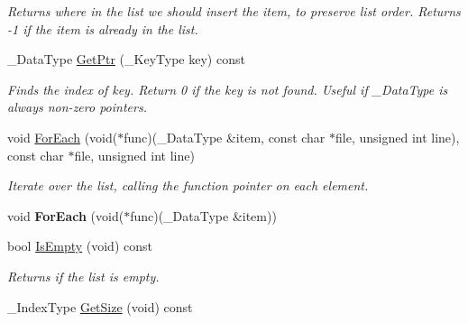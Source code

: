 \begin{DoxyCompactItemize}
\begin{DoxyCompactList}\small\item\em Returns where in the list we should insert the item, to preserve list order. Returns -\/1 if the item is already in the list. \end{DoxyCompactList}\item 
\hypertarget{class_data_structures_1_1_multilist_af718a952c67cb8e19e9863f087101340}{\-\_\-\-Data\-Type \hyperlink{class_data_structures_1_1_multilist_af718a952c67cb8e19e9863f087101340}{Get\-Ptr} (\-\_\-\-Key\-Type key) const }\label{class_data_structures_1_1_multilist_af718a952c67cb8e19e9863f087101340}

\begin{DoxyCompactList}\small\item\em Finds the index of {\itshape key}. Return 0 if the key is not found. Useful if \-\_\-\-Data\-Type is always non-\/zero pointers. \end{DoxyCompactList}\item 
\hypertarget{class_data_structures_1_1_multilist_a4e49b2800f3cfebdc4fa22e3ded43689}{void \hyperlink{class_data_structures_1_1_multilist_a4e49b2800f3cfebdc4fa22e3ded43689}{For\-Each} (void($\ast$func)(\-\_\-\-Data\-Type \&item, const char $\ast$file, unsigned int line), const char $\ast$file, unsigned int line)}\label{class_data_structures_1_1_multilist_a4e49b2800f3cfebdc4fa22e3ded43689}

\begin{DoxyCompactList}\small\item\em Iterate over the list, calling the function pointer on each element. \end{DoxyCompactList}\item 
\hypertarget{class_data_structures_1_1_multilist_aecde3bc96898c80714e3b0d12f907610}{void {\bfseries For\-Each} (void($\ast$func)(\-\_\-\-Data\-Type \&item))}\label{class_data_structures_1_1_multilist_aecde3bc96898c80714e3b0d12f907610}

\item 
\hypertarget{class_data_structures_1_1_multilist_a8d58006a5444efa6487d21faa8310bfe}{bool \hyperlink{class_data_structures_1_1_multilist_a8d58006a5444efa6487d21faa8310bfe}{Is\-Empty} (void) const }\label{class_data_structures_1_1_multilist_a8d58006a5444efa6487d21faa8310bfe}

\begin{DoxyCompactList}\small\item\em Returns if the list is empty. \end{DoxyCompactList}\item 
\hypertarget{class_data_structures_1_1_multilist_a374ed61cd2124ffd01e0bab732f89e61}{\-\_\-\-Index\-Type \hyperlink{class_data_structures_1_1_multilist_a374ed61cd2124ffd01e0bab732f89e61}{Get\-Size} (void) const }\label{class_data_structures_1_1_multilist_a374ed61cd2124ffd01e0bab732f89e61}


\end{DoxyCompactItemize}
